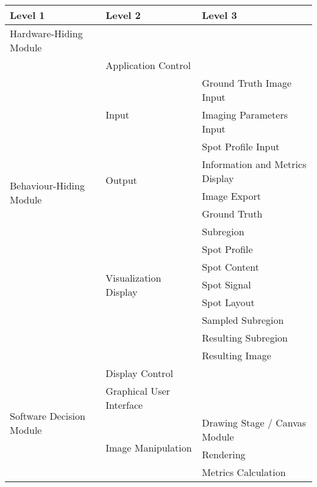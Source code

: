 \begin{tabular}{p{} p{} p{}}
\toprule
\textbf{Level 1} & \textbf{Level 2} & \textbf{Level 3}\\
\midrule

{Hardware-Hiding Module} & ~ \\
\midrule

\multirow{13}{0.3\textwidth}{Behaviour-Hiding Module}
  & Application Control \\
  \cline{2-3}
& \multirow{3}{0.3\textwidth}{Input}
  & Ground Truth Image Input \\
  && Imaging Parameters Input \\
  && Spot Profile Input \\
  \cline{2-3}
& \multirow{2}{0.3\textwidth}{Output}
  & Information and Metrics Display \\
  && Image Export\\
  \cline{2-3}
& \multirow{9}{0.3\textwidth}{Visualization Display}
  & Ground Truth \\
  && Subregion \\
  && Spot Profile \\
  && Spot Content \\
  && Spot Signal \\
  && Spot Layout \\
  && Sampled Subregion \\
  && Resulting Subregion \\
  && Resulting Image \\
\midrule

\multirow{5}{0.3\textwidth}{Software Decision Module}
  & Display Control \\
  \cline{2-3}
  & Graphical User Interface \\
  \cline{2-3}
& \multirow{3}{0.3\textwidth}{Image Manipulation}
  & Drawing Stage / Canvas Module \\
  && Rendering \\
  && Metrics Calculation \\
\bottomrule

\end{tabular}